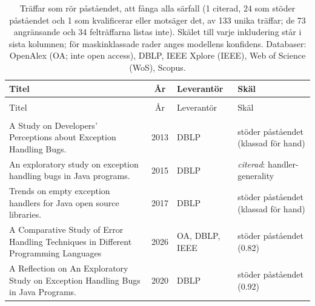 
\begingroup\footnotesize
\begin{longtable}{@{}%
  >{\raggedright\arraybackslash}p{}c%
  >{\raggedright\arraybackslash}p{}%
  >{\raggedright\arraybackslash}p{}@{}}
\caption{Träffar som rör påståendet, att fånga alla särfall (1 citerad, 24 som stöder påståendet och 1 som kvalificerar eller motsäger det, av 133 unika träffar; de 73 angränsande och 34 felträffarna listas inte). Skälet till varje inkludering står i sista kolumnen; för maskinklassade rader anges modellens konfidens. Databaser: OpenAlex (OA; inte open access), DBLP, IEEE Xplore (IEEE), Web of Science (WoS), Scopus.}\label{tab:sok-catchall}\\
\toprule
Titel & År & Leverantör & Skäl \\
\midrule
\endfirsthead
\multicolumn{4}{@{}l}{\emph{\tablename~\thetable{} (\GetTranslation{continued})}}\\
\toprule
Titel & År & Leverantör & Skäl \\
\midrule
\endhead
\midrule \multicolumn{4}{r@{}}{\emph{\GetTranslation{continued on the next page}}}\\
\endfoot
\bottomrule
\endlastfoot
A Study on Developers' Perceptions about Exception Handling Bugs. & 2013 & DBLP & stöder påståendet (klassad för hand) \\
An exploratory study on exception handling bugs in Java programs. & 2015 & DBLP & \emph{citerad}: handler-generality \\
Trends on empty exception handlers for Java open source libraries. & 2017 & DBLP & stöder påståendet (klassad för hand) \\
A Comparative Study of Error Handling Techniques in Different Programming Languages & 2026 & OA, DBLP, IEEE & stöder påståendet (0.82) \\
A Reflection on \textquotedbl{}An Exploratory Study on Exception Handling Bugs in Java Programs\textquotedbl{}. & 2020 & DBLP & stöder påståendet (0.92) \\

\end{longtable}
